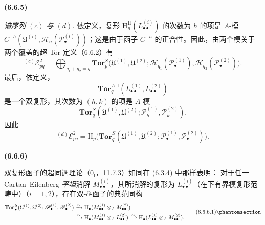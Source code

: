 \documentclass[UTF8,fontset=none,11pt,oneside,openany]{ctexbook}
\newenvironment{env}[1][]{%
  \par\medskip\noindent\textbf{(#1)}\ %
}{\par}
\newcommand{\oldpage}[2][]{%
  \hypertarget{ega-source-page-#1-#2}{}%
  \marginnote{\scriptsize\textbf{#1}~|~#2}\ignorespaces}
\let\EGAOriginalLabel\label
\renewcommand{\label}[1]{\phantomsection\EGAOriginalLabel{#1}}
\begin{document}
\oldpage[III]{156}
\begin{env}[6.6.5]
\emph{谱序列 $(c)$ 与 $(d)$.} 依定义，复形
$\mathrm H_n^{\mathrm{II}}(L_{\bullet\bullet}^{(i)})$ 的次数为 $h$ 的项是 $A$-模
$C^{-h}(\mathfrak U^{(i)},\mathscr H_n(\mathscr P_\bullet^{(i)}))$；这是由于函子
$C^{-h}$ 的正合性。因此，由两个模关于两个覆盖的超 Tor 定义（6.6.2）有
\[
  {}^{(c)}\mathscr E_{pq}^2
  =\bigoplus_{q_1+q_2=q}
   \mathbf{Tor}_p^S
   \bigl(\mathfrak U^{(1)},\mathfrak U^{(2)};
         \mathscr H_{q_1}(\mathscr P_\bullet^{(1)}),
         \mathscr H_{q_2}(\mathscr P_\bullet^{(2)})\bigr).
\]
最后，依定义，
\[
\mathbf{Tor}_q^{A,\mathrm I}
(L_{\bullet\bullet}^{(1)},L_{\bullet\bullet}^{(2)})
\]
是一个双复形，其次数为 $(h,k)$ 的项是 $A$-模
\[
\mathbf{Tor}_q^S
(\mathfrak U^{(1)},\mathfrak U^{(2)};
 \mathscr P_h^{(1)},\mathscr P_k^{(2)}).
\]
因此
\[
  {}^{(d)}\mathscr E_{pq}^2
  =\mathrm H_p\bigl(
    \mathbf{Tor}_q^S
    (\mathfrak U^{(1)},\mathfrak U^{(2)};
     \mathscr P_\bullet^{(1)},\mathscr P_\bullet^{(2)})\bigr).
\]
\end{env}

\begin{env}[6.6.6]
双复形函子的超同调理论（$0_{\mathrm I}$，11.7.3）如同在 (6.3.4) 中那样表明：
对于任一 Cartan--Eilenberg \emph{平坦}消解 $M_{\bullet\bullet}^{(i)}$，其所消解的复形为
$L_{\bullet\bullet}^{(i)}$（在下有界模复形范畴中）（$i=1,2$），存在双-$\partial$-函子的典范同构
\[
\begin{aligned}
  \mathbf{Tor}_\bullet^S
  (\mathfrak U^{(1)},\mathfrak U^{(2)};
   \mathscr P_\bullet^{(1)},\mathscr P_\bullet^{(2)})
  &\xrightarrow{\sim}
   \mathrm H_\bullet
   (M_{\bullet\bullet}^{(1)}\otimes_A M_{\bullet\bullet}^{(2)})\\
  &\xrightarrow{\sim}
   \mathrm H_\bullet
   (M_{\bullet\bullet}^{(1)}\otimes_A L_{\bullet\bullet}^{(2)})
   \xrightarrow{\sim}
   \mathrm H_\bullet
   (L_{\bullet\bullet}^{(1)}\otimes_A M_{\bullet\bullet}^{(2)}).
\end{aligned}
\tag{6.6.6.1}\label{III.6.6.6.1.fr}
\]
\end{env}
\end{document}
